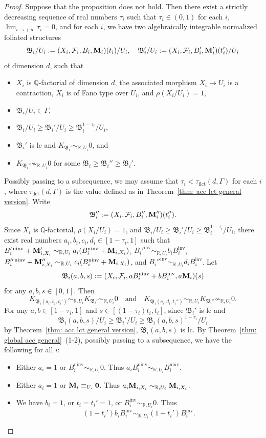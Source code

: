 \documentclass[11pt,reqno]{amsart}
\numberwithin{equation}{section}
\newcommand{\Mm}{{\bf{M}}}
\newcommand{\ninv}{\operatorname{ninv}}
\newcommand{\inv}{\operatorname{inv}}
\newcommand{\ilct}{\operatorname{ilct}}
\newcommand{\Bb}{{\mathfrak{B}}}
\newcommand{\Ff}{\mathcal{F}}
\newcommand{\Ii}{\Gamma}
\theoremstyle{definition}
\begin{document}
\begin{proof}
Suppose that the proposition does not hold. Then there exist a strictly decreasing sequence of real numbers $\tau_i$ such that $\tau_i\in (0,1)$ for each $i$, $\lim_{i\rightarrow+\infty}\tau_i=0$, and for each $i$, we have two algebraically integrable normalized foliated structures 
       $$\Bb_i/U_i:=(X_i,\Ff_i,B_i,\Mm_i)(t_i)/U_i,\quad \Bb_i'/U_i:=(X_i,\Ff_i,B_i',\Mm_i')(t_i')/U_i$$
      of dimension $d$, such that
       \begin{itemize}
       \item $X_i$ is $\mathbb Q$-factorial of dimension $d$, the associated morphism $X_i\rightarrow U_i$ is a contraction, $X_i$ is of Fano type over $U_i$, and $\rho(X_i/U_i)=1$,
        \item $\Bb_i/U_i\in\Ii$,
        \item $\Bb_i/U_i\geq\Bb_i'/U_i\geq\Bb_i^{1-\tau_i}/U_i$, 
        \item $\Bb_i'$ is lc and $K_{\Bb_i'}\sim_{\mathbb R,U_i}0$, and
        \item $K_{\Bb_i''}\not\sim_{\mathbb R,U_i}0$ for some $\Bb_i\geq\Bb_i''\geq\Bb_i'$.
       \end{itemize}
Possibly passing to a subsequence, we may assume that $\tau_i<\tau_{\ilct}(d,\Ii)$ for each $i$, where $\tau_{\ilct}(d,\Ii)$ is the value defined as in Theorem~\ref{thm: acc lct general version}. Write 
$$\Bb_i'':=(X_i,\Ff_i,B_i'',\Mm_i'')(t_i'').$$
Since $X_i$ is $\mathbb Q$-factorial, $\rho(X_i/U_i)=1$, and $\Bb_i/U_i\geq\Bb_i'/U_i\geq\Bb_i^{1-\tau_i}/U_i$, there exist real numbers $a_i,b_i,c_i,d_i\in [1-\tau_i,1]$ such that $B_i'^{\ninv}+\Mm'_{i,X_i}\sim_{\mathbb R,U_i}a_i(B_i^{\ninv}+\Mm_{i,X_i})$, $B_i'^{\inv}\sim_{\mathbb R,U_i}b_iB_i^{\inv}$, $B_i''^{\ninv}+\Mm''_{i,X_i}\sim_{\mathbb R,U_i}c_i(B_i^{\ninv}+\Mm_{i,X_i})$, and $B_i''^{\inv}\sim_{\mathbb R,U_i}d_iB_i^{\inv}$. Let
$$\Bb_i(a,b,s):=(X_i,\Ff_i,aB_i^{\ninv}+bB_i^{\inv},a\Mm_i)(s)$$
for any $a,b,s\in [0,1]$. Then
$$K_{\Bb_i(a_i,b_i,t_i')}\sim_{\mathbb R,U_i}K_{\Bb_i'}\sim_{\mathbb R,U_i}0\quad \text{and}\quad K_{\Bb_i(c_i,d_i,t_i'')}\sim_{\mathbb R,U_i}K_{\Bb_i''}\not\sim_{\mathbb R,U_i}0.$$
For any $a,b\in [1-\tau_i,1]$ and $s\in [(1-\tau_i)t_i,t_i]$, since $\Bb_i'$ is lc and $$\Bb_i(a,b,s)/U_i\geq\Bb_i'/U_i\geq\Bb_i(a,b,s)^{1-\tau_i}/U_i$$
 by Theorem~\ref{thm: acc lct general version}, $\Bb_i(a,b,s)$ is lc. By Theorem~\ref{thm: global acc general}~(1-2), possibly passing to a subsequence, we have the following for all $i$:
\begin{itemize}
    \item Either $a_i=1$ or $B_i^{\ninv}\sim_{\mathbb R,U_i}0$. Thus $a_iB_i^{\ninv}\sim_{\mathbb R,U_i}B_i^{\ninv}$.
    \item Either $a_i=1$ or $\Mm_i\equiv_{U_i}\bm{0}$. Thus $a_i\Mm_{i,X_i}\sim_{\mathbb R,U_i}\Mm_{i,X_i}$.
    \item We have $b_i=1$, or $t_i=t_i'=1$, or  $B_i^{\inv}\sim_{\mathbb R,U_i}0$. Thus $$(1-t_i')b_iB_i^{\inv}\sim_{\mathbb R,U_i}(1-t_i')B_i^{\inv}.$$ 


\end{itemize}
\end{proof}
\end{document}
